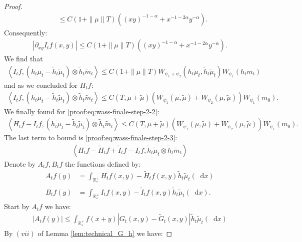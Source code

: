 \documentclass[11pt,a4paper]{article}
\newcommand{\RRP}{\mathbb{R}^+_*}
\newcommand{\brac}[1]{\left\langle#1\right\rangle}
\newcommand{\dd}{\mathop{}\!\mathrm{d}}
\begin{document}
\begin{proof}
\begin{align*}
        &\leq C(1 + \|\mu\|T) \left((xy)^{-1-\alpha} + x^{-1-2\alpha}y^{-\alpha}\right).
    \end{align*}
    Consequently:
    \begin{align*}
        \left| \partial_{xy} I_tf(x,y)\right| \leq C(1 + \|\mu\|T) \left((xy)^{-1-\alpha} + x^{-1-2\alpha}y^{-\alpha}\right).
    \end{align*}
    We find that 
    \begin{align*}
        \brac{I_tf,\left(h_t\mu_t - \tilde{h}_t\tilde{\mu}_t\right)\otimes \tilde{h}_t\tilde{m}_t}  \leq C\left(1 + \|\mu\|T\right)W_{\psi_1 + \psi_2}\left( h_t\mu_t , \tilde{h}_t\tilde{\mu}_t\right)W_{\psi_1}\left(h_t m_t \right)
    \end{align*}
    and as we concluded for $H_tf$:
    \begin{align*}
        \brac{I_tf,\left(h_t\mu_t - \tilde{h}_t\tilde{\mu}_t\right)\otimes \tilde{h}_t\tilde{m}_t}  \leq C(T,\mu + \tilde{\mu})\left(W_{\psi_1}\left( \mu , \tilde{\mu}\right) + W_{\psi_2}\left( \mu , \tilde{\mu}\right)\right)W_{\psi_1}\left(m_0\right).
    \end{align*}
    We finally found for \eqref{proof:eq:wass-finale-step-2-2}:
    \begin{align*}
        \brac{H_tf - I_tf,\left(h_t\mu_t - \tilde{h}_t\tilde{\mu}_t\right)\otimes \tilde{h}_t\tilde{m}_t}  \leq C(T,\mu + \tilde{\mu})\left(W_{\psi_1}\left( \mu , \tilde{\mu}\right) + W_{\psi_2}\left( \mu , \tilde{\mu}\right)\right)W_{\psi_1}\left(m_0\right).
    \end{align*}
    The last term to bound is \eqref{proof:eq:wass-finale-step-2-3}:
    \begin{align*}
        \brac{H_tf-\tilde{H}_tf + \tilde{I}_tf - I_tf,\tilde{h}_t\tilde{\mu}_t\otimes \tilde{h}_t\tilde{m}_t}
    \end{align*}
    Denote by $A_tf, B_tf$ the functions defined by:
    \begin{align*}
        A_tf(y) &= \int_{\RRP} H_tf(x,y)-\tilde{H}_tf(x,y)  \tilde{h}_t\tilde{\mu}_t(\dd x) \\
        B_tf(y) &= \int_{\RRP} I_tf(x,y)-\tilde{I}_tf(x,y)  \tilde{h}_t\tilde{\mu}_t(\dd x).
    \end{align*}
    Start by $A_tf$ we have:
    \begin{align*}
        \left|A_tf(y)\right| \leq \int_{\RRP} f(x+y) \left|G_t(x,y) - \tilde{G}_t(x,y) \right| \tilde{h}_t\tilde{\mu}_t(\dd x)
    \end{align*}
    By $(vii)$ of Lemma \ref{lem:technical_G_h} we have:

\end{proof}
\end{document}
